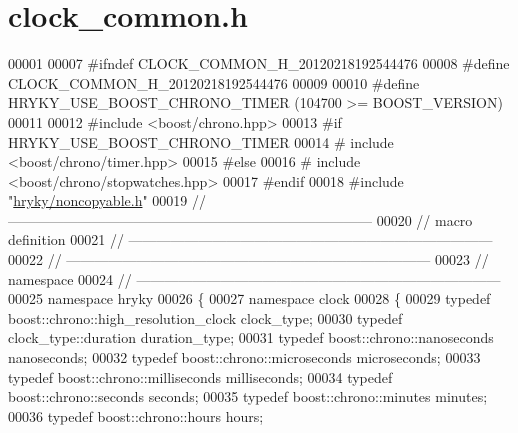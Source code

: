 \hypertarget{clock__common_8h_source}{\section{clock\-\_\-common.\-h}
}

\begin{DoxyCode}
00001 
00007 \textcolor{preprocessor}{#ifndef CLOCK\_COMMON\_H\_20120218192544476}
00008 \textcolor{preprocessor}{}\textcolor{preprocessor}{#define CLOCK\_COMMON\_H\_20120218192544476}
00009 \textcolor{preprocessor}{}
00010 \textcolor{preprocessor}{#define HRYKY\_USE\_BOOST\_CHRONO\_TIMER     (104700 >= BOOST\_VERSION)}
00011 \textcolor{preprocessor}{}
00012 \textcolor{preprocessor}{#include <boost/chrono.hpp>}
00013 \textcolor{preprocessor}{#if HRYKY\_USE\_BOOST\_CHRONO\_TIMER}
00014 \textcolor{preprocessor}{}\textcolor{preprocessor}{#   include <boost/chrono/timer.hpp>}
00015 \textcolor{preprocessor}{#else}
00016 \textcolor{preprocessor}{}\textcolor{preprocessor}{#   include <boost/chrono/stopwatches.hpp>}
00017 \textcolor{preprocessor}{#endif}
00018 \textcolor{preprocessor}{}\textcolor{preprocessor}{#include "\hyperlink{noncopyable_8h}{hryky/noncopyable.h}"}
00019 \textcolor{comment}{//
      ------------------------------------------------------------------------------}
00020 \textcolor{comment}{// macro definition}
00021 \textcolor{comment}{//
      ------------------------------------------------------------------------------}
00022 \textcolor{comment}{//
      ------------------------------------------------------------------------------}
00023 \textcolor{comment}{// namespace}
00024 \textcolor{comment}{//
      ------------------------------------------------------------------------------}
00025 \textcolor{keyword}{namespace }hryky
00026 \{
00027 \textcolor{keyword}{namespace }clock
00028 \{
00029     \textcolor{keyword}{typedef} boost::chrono::high\_resolution\_clock        clock\_type;
00030     \textcolor{keyword}{typedef} clock\_type::duration                        duration\_type;
00031     \textcolor{keyword}{typedef} boost::chrono::nanoseconds                  nanoseconds;
00032     \textcolor{keyword}{typedef} boost::chrono::microseconds                 microseconds;
00033     \textcolor{keyword}{typedef} boost::chrono::milliseconds                 milliseconds;
00034     \textcolor{keyword}{typedef} boost::chrono::seconds                      seconds;
00035     \textcolor{keyword}{typedef} boost::chrono::minutes                      minutes;
00036     \textcolor{keyword}{typedef} boost::chrono::hours                        hours;

\end{DoxyCode}
